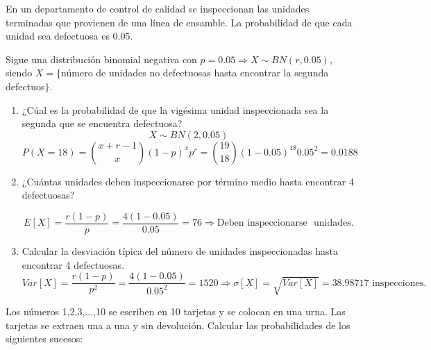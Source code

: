 \begin{ejer}
En un departamento de control de calidad se inspeccionan las unidades terminadas que provienen de una línea de ensamble. La probabilidad de que cada unidad sea defectuosa es 0.05.

\end{ejer}
\begin{sol}
Sigue una distribución binomial negativa con $p=0.05 \Longrightarrow X \sim BN(r, 0.05)$, siendo $X=\{$número de unidades no defectuosas hasta encontrar la segunda defectuos$\}$.

\begin{enumerate}
\item ¿Cúal es la probabilidad de que la vigésima unidad inspeccionada sea la segunda que se encuentra defectuosa?
\[
X \sim BN(2, 0.05)
\]
\[
P(X=18) = \binom{x+r-1}{x}(1-p)^xp^r=\binom{19}{18}(1-0.05)^{18}0.05^2=0.0188
\]

\item ¿Cuántas unidades deben inspeccionarse por término medio hasta encontrar 4 defectuosas?

\[
E[X] = \frac{r(1-p)}{p}=\frac{4(1-0.05)}{0.05} = 76 \Longrightarrow \text{Deben inspeccionarse } \text{ unidades.} 
\]

\item Calcular la desviación típica del número de unidades inspeccionadas hasta encontrar 4 defectuosas.
\[
Var[X] = \frac{r(1-p)}{p^2}=\frac{4(1-0.05)}{0.05^2}=1520 \Longrightarrow \sigma [X] = \sqrt{Var[X]} = 38.98717 \text{ inspecciones.}
\]

\end{enumerate}

\end{sol}

\begin{ejer}
Los números 1,2,3,...,10 se escriben en 10 tarjetas y se colocan en una urna. Las tarjetas se extraen una a una y sin devolución. Calcular las probabilidades de los siguientes sucesos:
\end{ejer}

